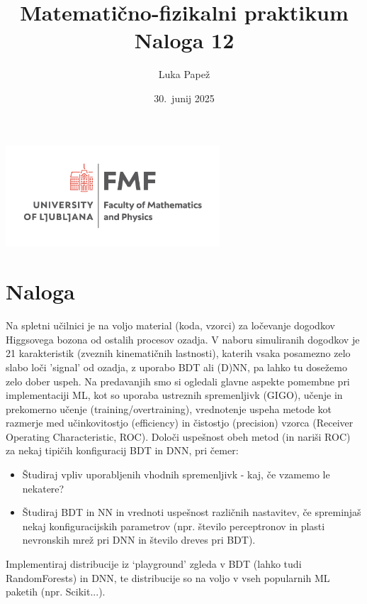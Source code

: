 \documentclass{article}
\begin{document}
\title{Matematično-fizikalni praktikum \\[3mm] \large Naloga 12}
\author{Luka Papež}
\date{30.\ junij 2025}

\begin{center}
    \includegraphics[width=8cm]{logo-fmf.png}
\end{center}

{
    \let\newpage\relax
    \maketitle
}

\newpage
\section{Naloga}
Na spletni učilnici je na voljo material (koda, vzorci) za 
ločevanje dogodkov Higgsovega bozona od ostalih procesov ozadja. V naboru simuliranih 
dogodkov je 21 karakteristik (zveznih kinematičnih lastnosti), katerih vsaka 
posamezno zelo slabo loči 'signal' od ozadja, z uporabo BDT ali (D)NN, pa lahko tu dosežemo
zelo dober uspeh.  Na predavanjih smo si ogledali glavne aspekte pomembne pri implementaciji ML, 
kot so  uporaba ustreznih spremenljivk (GIGO), učenje in prekomerno učenje (training/overtraining), 
vrednotenje uspeha metode kot razmerje med učinkovitostjo (efficiency) in čistostjo (precision) 
vzorca (Receiver Operating Characteristic, ROC). Določi uspešnost obeh metod (in nariši ROC) 
za nekaj tipičih konfiguracij BDT in DNN, pri čemer:
\begin{itemize}
  \item Študiraj vpliv uporabljenih vhodnih spremenljivk - kaj, če vzamemo le nekatere?
  \item Študiraj BDT in NN in vrednoti uspešnost različnih nastavitev,  če spreminjaš nekaj konfiguracijskih parametrov
  (npr. število perceptronov in plasti nevronskih mrež pri DNN in število dreves pri BDT). 
\end{itemize}

 Implementiraj distribucije iz ‘playground’ zgleda v BDT (lahko tudi RandomForests) in DNN,
te distribucije so na voljo v vseh popularnih ML paketih (npr. Scikit...).
\end{document}
